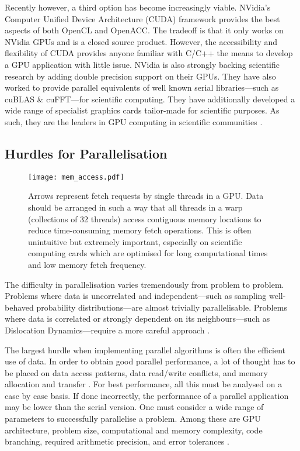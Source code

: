 Recently however, a third option has become increasingly viable. NVidia's Computer Unified Device Architecture (CUDA) framework provides the best aspects of both OpenCL and OpenACC. The tradeoff is that it only works on NVidia GPUs and is a closed source product. However, the accessibility and flexibility of CUDA provides anyone familiar with C/C++ the means to develop a GPU application with little issue. NVidia is also strongly backing scientific research by adding double precision support on their GPUs. They have also worked to provide parallel equivalents of well known serial libraries---such as cuBLAS \& cuFFT---for scientific computing. They have additionally developed a wide range of specialist graphics cards tailor-made for scientific purposes. As such, they are the leaders in GPU computing in scientific communities \cite{nvidia}.

\subsection{Hurdles for Parallelisation}
\begin{figure}[t]
	\centering
	\texttt{[image: mem\_access.pdf]}
	\caption[Memory access pattern example.]{Arrows represent fetch requests by single threads in a GPU. Data should be arranged in such a way that all threads in a warp (collections of 32 threads) access contiguous memory locations to reduce time-consuming memory fetch operations. This is often unintuitive but extremely important, especially on scientific computing cards which are optimised for long computational times and low memory fetch frequency.}
	\label{f:mem_access}
\end{figure}

The difficulty in parallelisation varies tremendously from problem to problem. Problems where data is uncorrelated and independent---such as sampling well-behaved probability distributions---are almost trivially parallelisable. Problems where data is correlated or strongly dependent on its neighbours---such as Dislocation Dynamics---require a more careful approach \cite{parallel_algs}.

The largest hurdle when implementing parallel algorithms is often the efficient use of data. In order to obtain good parallel performance, a lot of thought has to be placed on data access patterns, data read/write conflicts, and memory allocation and transfer \cite{nvidia}. For best performance, all this must be analysed on a case by case basis. If done incorrectly, the performance of a parallel application may be lower than the serial version. One must consider a wide range of parameters to successfully parallelise a problem. Among these are GPU architecture, problem size, computational and memory complexity, code branching, required arithmetic precision, and error tolerances \cite{nvidia, gpu_rev}.

